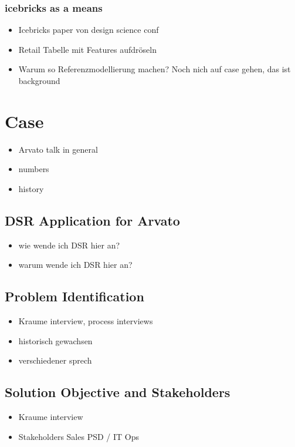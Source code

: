 		\subsection{icebricks as a means}
		\begin{itemize}
			\item Icebricks paper von design science conf
			\item Retail Tabelle mit Features aufdröseln 
			\item Warum so Referenzmodellierung machen? Noch nich auf case gehen, das ist background
		\end{itemize}
\chapter{Case}
\begin{itemize}
	\item Arvato talk in general
	\item numbers
	\item history
\end{itemize}
\section{DSR Application for Arvato}
\begin{itemize}
	\item wie wende ich DSR hier an?
	\item warum wende ich DSR hier an?
	
\end{itemize}
\section{Problem Identification}
\begin{itemize}
	\item Kraume interview, process interviews
	\item historisch gewachsen
	\item verschiedener sprech
	
\end{itemize}
\section{Solution Objective and Stakeholders}
\begin{itemize}
	\item Kraume interview
	\item Stakeholders
	\subitem Sales
	\subitem PSD / IT
	\subitem Ops
\end{itemize}
